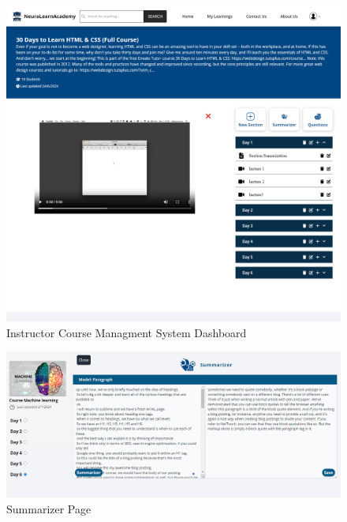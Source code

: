 \begin{figure}[h!]
	\centering
	\includegraphics[max height=\textheight,max width=\textwidth]{figures/frontend/dashboard-cms.png}
	\caption{Instructor Course Managment System Dashboard}
\end{figure}

\begin{figure}[h!]
	\centering
	\includegraphics[max height=\textheight,max width=\textwidth]{figures/frontend/summarizer.png}
	\caption{Summarizer Page}
\end{figure}

